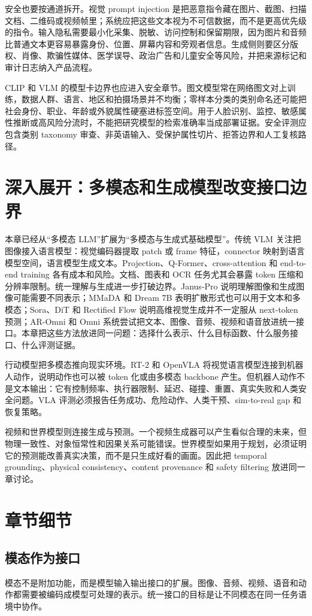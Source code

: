 \documentclass[UTF8,zihao=-4,openany]{ctexbook}
\begin{document}
安全也要按通道拆开。视觉 prompt injection 是把恶意指令藏在图片、截图、扫描文档、二维码或视频帧里；系统应把这些文本视为不可信数据，而不是更高优先级的指令。输入隐私需要最小化采集、脱敏、访问控制和保留期限，因为图片和音频比普通文本更容易暴露身份、位置、屏幕内容和旁观者信息。生成侧则要区分版权、肖像、欺骗性媒体、医学误导、政治广告和儿童安全等风险，并把来源标记和审计日志纳入产品流程。

CLIP 和 VLM 的模型卡边界也应进入安全章节。图文模型常在网络图文对上训练，数据人群、语言、地区和拍摄场景并不均衡；零样本分类的类别命名还可能把社会身份、职业、年龄或外貌属性硬塞进标签空间。用于人脸识别、监控、敏感属性推断或高风险分流时，不能把研究模型的检索准确率当成部署证据。安全评测应包含类别 taxonomy 审查、非英语输入、受保护属性切片、拒答边界和人工复核路径。

\section{深入展开：多模态和生成模型改变接口边界}
本章已经从“多模态 LLM”扩展为“多模态与生成式基础模型”。传统 VLM 关注把图像接入语言模型：视觉编码器提取 patch 或 frame 特征，connector 映射到语言模型空间，语言模型生成文本。Projection、Q-Former、cross-attention 和 end-to-end training 各有成本和风险。文档、图表和 OCR 任务尤其会暴露 token 压缩和分辨率限制。统一理解与生成进一步打破边界。Janus-Pro 说明理解图像和生成图像可能需要不同表示；MMaDA 和 Dream 7B 表明扩散形式也可以用于文本和多模态；Sora、DiT 和 Rectified Flow 说明高维视觉生成并不一定服从 next-token 预测；AR-Omni 和 Omni 系统尝试把文本、图像、音频、视频和语音放进统一接口。本章把这些方法放进同一问题：选择什么表示、什么目标函数、什么服务接口、什么评测证据。

行动模型把多模态推向现实环境。RT-2 和 OpenVLA 将视觉语言模型连接到机器人动作，说明动作也可以被 token 化或由多模态 backbone 产生。但机器人动作不是文本输出：它有控制频率、执行器限制、延迟、碰撞、重置、真实失败和人类安全问题。VLA 评测必须报告任务成功、危险动作、人类干预、sim-to-real gap 和恢复策略。

视频和世界模型则连接生成与预测。一个视频生成器可以产生看似合理的未来，但物理一致性、对象恒常性和因果关系可能错误。世界模型如果用于规划，必须证明它的预测能改善真实决策，而不是只生成好看的画面。因此把 temporal grounding、physical consistency、content provenance 和 safety filtering 放进同一章讨论。

\section{章节细节}
\subsection{模态作为接口}
模态不是附加功能，而是模型输入输出接口的扩展。图像、音频、视频、语音和动作都需要被编码成模型可处理的表示。统一接口的目标是让不同模态在同一任务语境中协作。
\end{document}
